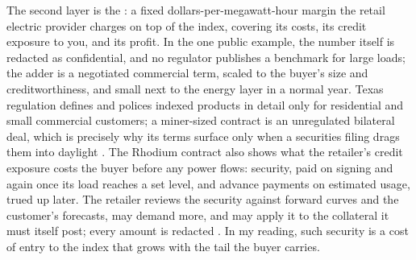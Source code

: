 The second layer is the : a fixed dollars-per-megawatt-hour margin the retail electric provider charges on top of the index, covering its costs, its credit exposure to you, and its profit. In the one public example, the number itself is redacted as confidential, and no regulator publishes a benchmark for large loads; the adder is a negotiated commercial term, scaled to the buyer's size and creditworthiness, and small next to the energy layer in a normal year. %
Texas regulation defines and polices indexed products in detail only for residential and small commercial customers; a miner-sized contract is an unregulated bilateral deal, which is precisely why its terms surface only when a securities filing drags them into daylight \autocite{puct25475}. %
The Rhodium contract also shows what the retailer's credit exposure costs the buyer before any power flows: security, paid on signing and again once its load reaches a set level, and advance payments on estimated usage, trued up later. The retailer reviews the security against forward curves and the customer's forecasts, may demand more, and may apply it to the collateral it must itself post; every amount is redacted \autocite{rhodium2022indexcontract}. %
In my reading, such security is a cost of entry to the index that grows with the tail the buyer carries.

